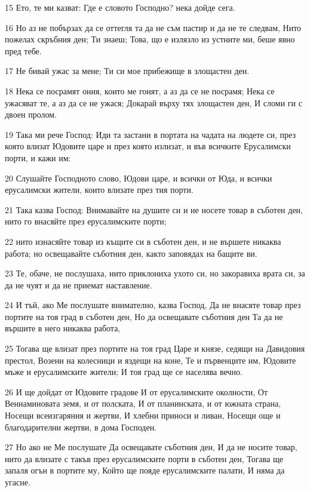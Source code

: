 \par 15 Ето, те ми казват: Где е словото Господно? нека дойде сега.
\par 16 Но аз не побързах да се оттегля та да не съм пастир и да не те следвам, Нито пожелах скръбния ден; Ти знаеш; Това, що е излязло из устните ми, беше явно пред тебе.
\par 17 Не бивай ужас за мене; Ти си мое прибежище в злощастен ден.
\par 18 Нека се посрамят ония, които ме гонят, а аз да се не посрамя; Нека се ужасяват те, а аз да се не ужася; Докарай върху тях злощастен ден, И сломи ги с двоен пролом.
\par 19 Така ми рече Господ: Иди та застани в портата на чадата на людете си, през която влизат Юдовите царе и през която излизат, и във всичките Ерусалимски порти, и кажи им:
\par 20 Слушайте Господното слово, Юдови царе, и всички от Юда, и всички ерусалимски жители, които влизате през тия порти.
\par 21 Така казва Господ: Внимавайте на душите си и не носете товар в съботен ден, нито го внасяйте през ерусалимските порти;
\par 22 нито изнасяйте товар из къщите си в съботен ден, и не вършете никаква работа; но освещавайте съботния ден, както заповядах на бащите ви.
\par 23 Те, обаче, не послушаха, нито приклониха ухото си, но закоравиха врата си, за да не чуят и да не приемат наставление.
\par 24 И тъй, ако Ме послушате внимателно, казва Господ, Да не внасяте товар през портите на тоя град в съботен ден, Но да освещавате съботния ден Та да не вършите в него никаква работа,
\par 25 Тогава ще влизат през портите на тоя град Царе и князе, седящи на Давидовия престол, Возени на колесници и яздещи на коне, Те и първенците им, Юдовите мъже и ерусалимските жители; И тоя град ще се населява вечно.
\par 26 И ще дойдат от Юдовите градове И от ерусалимските околности, От Вениаминовата земя, и от полската, И от планинската, и от южната страна, Носещи всеизгаряния и жертви, И хлебни приноси и ливан, Носещи още и благодарителни жертви, в дома Господен.
\par 27 Но ако не Ме послушате Да освещавате съботния ден, И да не носите товар, нито да влизате с такъв през ерусалимските порти в съботен ден, Тогава ще запаля огън в портите му, Който ще пояде ерусалимските палати, И няма да угасне.

